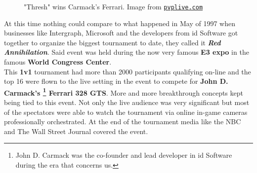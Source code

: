 \begin{figure}
	\begin{center}
		
		\caption{"Thresh" wins Carmack's Ferrari. Image from \href{https://pvplive.com/c/cars-esports-prize-tournaments}{\nolinkurl{pvplive.com}}}
	\end{center}
\end{figure}

At this time nothing could compare to what happened in May of 1997 when businesses like Intergraph, Microsoft and the developers from id Software got together to organize the biggest tournament to date, they called it \textbf{\textit{Red Annihilation}}. Said event was held during the now very famous \textbf{E3 expo} \citep{e3} in the famous \textbf{World Congress Center}.\\


This \textbf{1v1} tournament had more than 2000 participants qualifying on-line and the top 16 were flown to the live setting in the event to compete for \textbf{John D. Carmack's \footnote{John D. Carmack was the co-founder and lead developer in id Software during the era that concerns us.} Ferrari 328 GTS}. More and more breakthrough concepts kept being tied to this event. Not only the live audience was very significant but most of the spectators were able to watch the tournament via online in-game cameras professionally orchestrated. At the end of the tournament media like the NBC and The Wall Street Journal covered the event.\\

